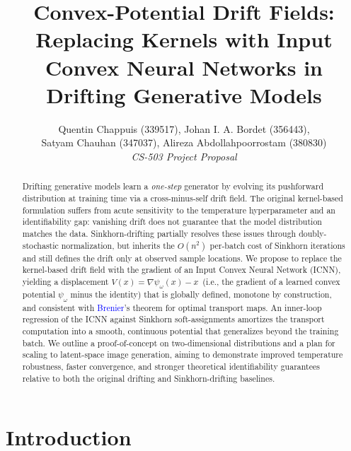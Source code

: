 \documentclass[10pt,conference,compsocconf]{IEEEtran}
\begin{document}
\title{Convex-Potential Drift Fields: Replacing Kernels with Input Convex Neural Networks in Drifting Generative Models}


\author{
  Quentin Chappuis (339517), Johan I. A. Bordet (356443), \\
  Satyam Chauhan (347037), Alireza Abdollahpoorrostam (380830) \\[1ex]
  \textit{CS-503 Project Proposal}
}

\maketitle

\begin{abstract}
Drifting generative models learn a \emph{one-step} generator by evolving its pushforward distribution at training time via a cross-minus-self drift field.
The original kernel-based formulation suffers from acute sensitivity to the temperature hyperparameter and an identifiability gap: vanishing drift does not guarantee that the model distribution matches the data.
Sinkhorn-drifting partially resolves these issues through doubly-stochastic normalization, but inherits the $O(n^2)$ per-batch cost of Sinkhorn iterations and still defines the drift only at observed sample locations.
We propose to replace the kernel-based drift field with the gradient of an Input Convex Neural Network (ICNN), yielding a displacement $V(x) = \nabla\psi_\omega(x) - x$~(i.e., the gradient of a learned convex potential $\psi_\omega$ minus the identity) that is globally defined, monotone by construction, and consistent with \textcolor{blue}{Brenier}'s theorem for optimal transport maps.
An inner-loop regression of the ICNN against Sinkhorn soft-assignments amortizes the transport computation into a smooth, continuous potential that generalizes beyond the training batch.
We outline a proof-of-concept on two-dimensional distributions and a plan for scaling to latent-space image generation, aiming to demonstrate improved temperature robustness, faster convergence, and stronger theoretical identifiability guarantees relative to both the original drifting and Sinkhorn-drifting baselines. 
\end{abstract}


\section{Introduction}
\end{document}
